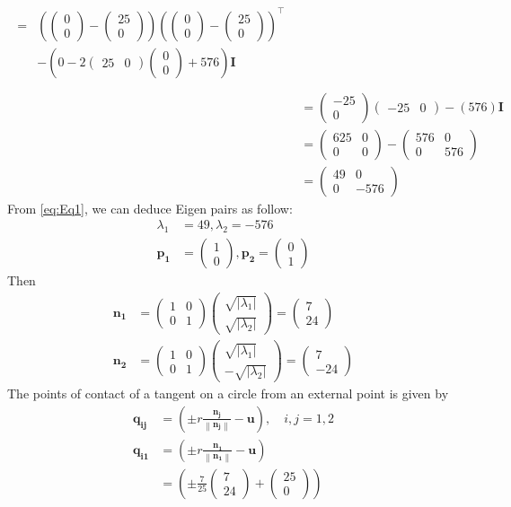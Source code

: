 \documentclass[12pt]{article}
\providecommand{\brak}[1]{\ensuremath{\left(#1\right)}}
\providecommand{\norm}[1]{\left\lVert#1\right\rVert}
\providecommand{\abs}[1]{\left\vert#1\right\vert}
\newcommand{\myvec}[1]{\ensuremath{\begin{pmatrix}#1\end{pmatrix}}}
\let\vec\mathbf
\begin{document}
\begin{enumerate}
\begin{align}
  \begin{split}
	={}& \brak{\myvec{0\\0}-\myvec{25\\0}}\brak{\myvec{0\\0}-\myvec{25\\0}}^\top \\
	   & -\brak{0-2\myvec{25&0}\myvec{0 \\0}+576}\vec{I}\\ 
  \end{split}\\
	&= \myvec{-25\\0}\myvec{-25&0} - \brak{576}\vec{I} \\ 
	&= \myvec{625&0\\0&0 } - \myvec{576&0\\0&576} \\ 
        \label{eq:Eq1}
	&= \myvec{49&0\\0&-576 } 
\end{align}
From \eqref{eq:Eq1}, we can deduce Eigen pairs as follow: 
\begin{align}
	\lambda_1 &= 49 , \lambda_2 = -576 \\
	\vec{p_1} &= \myvec{1\\0} , \vec{p_2} = \myvec{0\\1}
\end{align}
Then
\begin{align}
	\vec{n_1} &= \myvec{1&0\\0&1}\myvec{\sqrt{\abs{\lambda_1}} \\ \sqrt{\abs{\lambda_2}}} = \myvec{7\\24} \\
	\vec{n_2} &= \myvec{1&0\\0&1}\myvec{\sqrt{\abs{\lambda_1}} \\ -\sqrt{\abs{\lambda_2}}} = \myvec{7\\-24}
\end{align}
The points of contact of a tangent on a circle from an external point is given by 
\begin{align}
	\vec{q_{ij}} &= \brak{\pm r \frac{\vec{n_j}}{\norm{\vec{n_j}}}- \vec{u}},  \quad i,j = 1,2 \\
	\vec{q_{i1}} &= \brak{\pm r \frac{\vec{n_1}}{\norm{\vec{n_1}}}- \vec{u}} \\
	&= \brak{\pm \frac{7}{25}\myvec{7\\24}+ \myvec{25\\0}} \\

\end{align}
\end{enumerate}
\end{document}
